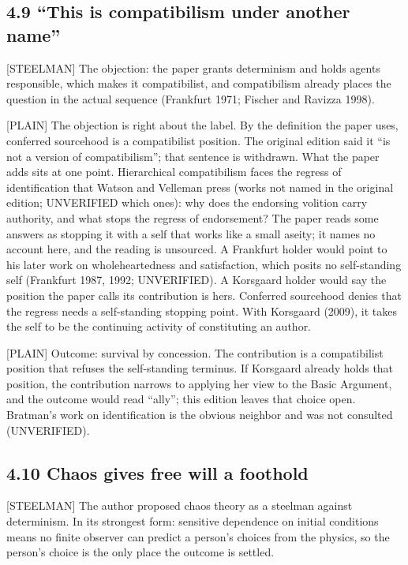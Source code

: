 \documentclass[11pt]{article}
\newcommand{\register}[1]{{\ttfamily\small #1}}
\begin{document}
\subsection*{4.9 ``This is compatibilism under another name''}

\register{[STEELMAN]} The objection: the paper grants determinism and holds agents responsible, which makes it compatibilist, and compatibilism already places the question in the actual sequence (Frankfurt 1971; Fischer and Ravizza 1998).

\register{[PLAIN]} The objection is right about the label. By the definition the paper uses, conferred sourcehood is a compatibilist position. The original edition said it ``is not a version of compatibilism''; that sentence is withdrawn. What the paper adds sits at one point. Hierarchical compatibilism faces the regress of identification that Watson and Velleman press (works not named in the original edition; UNVERIFIED which ones): why does the endorsing volition carry authority, and what stops the regress of endorsement? The paper reads some answers as stopping it with a self that works like a small aseity; it names no account here, and the reading is unsourced. A Frankfurt holder would point to his later work on wholeheartedness and satisfaction, which posits no self-standing self (Frankfurt 1987, 1992; UNVERIFIED). A Korsgaard holder would say the position the paper calls its contribution is hers. Conferred sourcehood denies that the regress needs a self-standing stopping point. With Korsgaard (2009), it takes the self to be the continuing activity of constituting an author.

\register{[PLAIN]} Outcome: survival by concession. The contribution is a compatibilist position that refuses the self-standing terminus. If Korsgaard already holds that position, the contribution narrows to applying her view to the Basic Argument, and the outcome would read ``ally''; this edition leaves that choice open. Bratman's work on identification is the obvious neighbor and was not consulted (UNVERIFIED).

\subsection*{4.10 Chaos gives free will a foothold}

\register{[STEELMAN]} The author proposed chaos theory as a steelman against determinism. In its strongest form: sensitive dependence on initial conditions means no finite observer can predict a person's choices from the physics, so the person's choice is the only place the outcome is settled.
\end{document}

